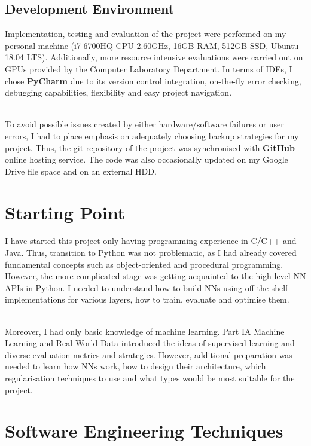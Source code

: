 \subsection{Development Environment}

Implementation, testing and evaluation of the project were performed on my personal machine (i7-6700HQ CPU 2.60GHz, 16GB RAM, 512GB SSD,  Ubuntu 18.04 LTS). Additionally, more resource intensive evaluations were carried out on GPUs provided by the Computer Laboratory Department. In terms of IDEs, I chose \textbf{PyCharm} due to its version control integration, on-the-fly error checking, debugging capabilities, flexibility and easy project navigation. \\\

To avoid possible issues created by either hardware/software failures or user errors, I had to place emphasis on adequately choosing backup strategies for my project. Thus, the git repository of the project was synchronised with \textbf{GitHub} online hosting service. The code was also occasionally updated on my Google Drive file space and on an external HDD. \\

\section{Starting Point}

I have started this project only having programming experience in C/C++ and Java. Thus, transition to Python was not problematic, as I had already covered fundamental concepts such as object-oriented and procedural programming. However, the more complicated stage was getting acquainted to the high-level NN APIs in Python. I needed to understand how to build NNs using off-the-shelf implementations for various layers, how to train, evaluate and optimise them. \\\

Moreover, I had only basic knowledge of machine learning. Part IA Machine Learning and Real World Data introduced the ideas of supervised learning and diverse evaluation metrics and strategies. However, additional preparation was needed to learn how NNs work, how to design their architecture, which regularisation techniques to use and what types would be most suitable for the project. \\

\section{Software Engineering Techniques}

